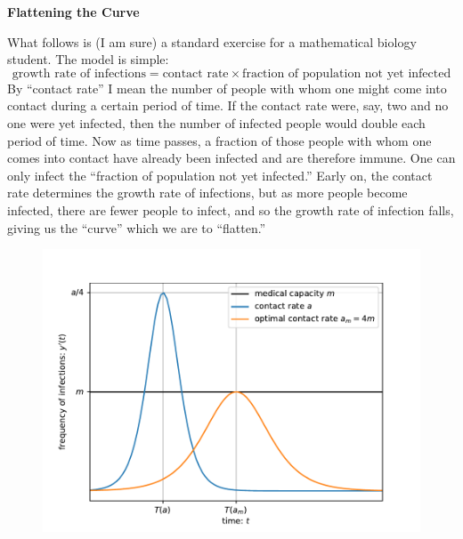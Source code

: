 \documentclass[12pt]{article}
\begin{document}
\onehalfspacing
\begin{center}
	\textbf{Flattening the Curve}
\end{center}
	What follows is (I am sure) a standard exercise for a mathematical biology student. The model is simple:
\begin{equation}
	\text{growth rate of infections} = \text{contact rate}\times\text{fraction of population not yet infected}
\end{equation}
By ``contact rate'' I mean the number of people with whom one might come into contact during a certain period of time. If the contact rate were, say, two and no one were yet infected, then the number of infected people would double each period of time. Now as time passes, a fraction of those people with whom one comes into contact have already been infected and are therefore immune. One can only infect the ``fraction of population not yet infected.'' Early on, the contact rate determines the growth rate of infections, but as more people become infected, there are fewer people to infect, and so the growth rate of infection falls, giving us the ``curve'' which we are to ``flatten.''  

\begin{figure}[H]
	\begin{center}
		\includegraphics{curve}
	\end{center}
\end{figure}
\end{document}
